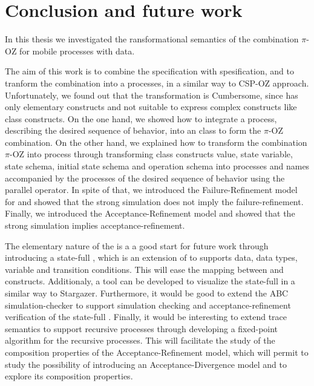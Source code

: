 \chapter{Conclusion and future work}
\label{sec_conclusion}
In this thesis we investigated the ransformational semantics of the combination $\pi$-OZ for mobile processes with data.

The aim of this work is to combine the \oz{} specification with \picalc{} spesification, and to tranform the combination into a \picalc{} processes, in a similar way to CSP-OZ \cite{olderog} approach. Unfortunately, we found out that the transformation is Cumbersome, since \picalc{} has only elementary constructs and not suitable to express complex constructs like \oz{} class constructs. On the one hand, we showed how to integrate a \picalc{} process, describing the desired sequence of behavior, into an \oz{} class to form the $\pi$-OZ combination. On the other hand, we explained how to transform the combination $\pi$-OZ into \picalc{} process through transforming \oz{} class constructs value, state variable, state schema, initial state schema and operation schema into \picalc{} processes and names accompanied by the processes of the desired sequence of behavior using the parallel operator. In spite of that, we introduced the Failure-Refinement model for \picalc{} and showed that the strong simulation does not imply the failure-refinement. Finally, we introduced the Acceptance-Refinement model and showed that the strong simulation implies acceptance-refinement. 

The elementary nature of the \picalc{} is a a good start for future work through introducing a state-full \picalc{}, which is an extension of \picalc{} to supports data, data types, variable and transition conditions. This will ease the mapping between \oz{} and \picalc{} constructs. Additionaly, a tool can be developed to visualize the state-full \picalc{} in a similar way to Stargazer\cite{stargazer}. Furthermore, it would be good to extend the ABC simulation-checker \cite{abc} to support simulation checking and acceptance-refinement verification of the state-full \picalc{}. Finally, it would be interesting to extend \cite{gieseking} trace semantics to support recursive processes through developing a fixed-point algorithm for the recursive processes. This will facilitate the study of the composition properties of the Acceptance-Refinement model, which will permit to study the possibility of introducing an Acceptance-Divergence model and to explore its composition properties.
